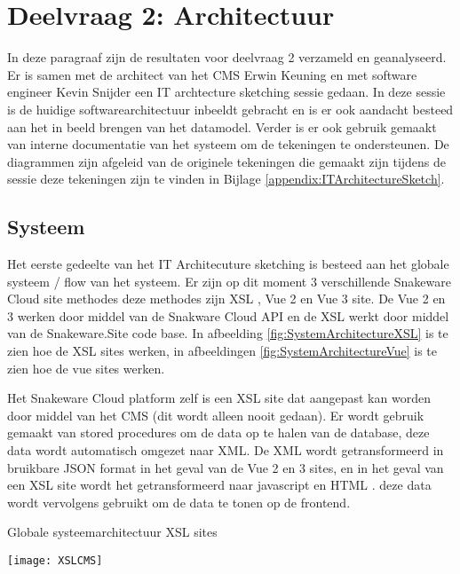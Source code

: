 \section{Deelvraag 2: Architectuur}
In deze paragraaf zijn de resultaten voor deelvraag 2 \textit{\SubquestionTwo} verzameld en geanalyseerd.
Er is samen met de architect van het CMS Erwin Keuning en met software engineer Kevin Snijder een IT archtecture sketching sessie gedaan.
In deze sessie is de huidige softwarearchitectuur inbeeldt gebracht en is er ook aandacht besteed aan het in beeld brengen van het datamodel.
Verder is er ook gebruik gemaakt van interne documentatie van het systeem om de tekeningen te ondersteunen.
De diagrammen zijn afgeleid van de originele tekeningen die gemaakt zijn tijdens de sessie deze tekeningen zijn te vinden in Bijlage \ref{appendix:ITArchitectureSketch}.


\subsection{Systeem}
Het eerste gedeelte van het IT Architecuture sketching is besteed aan het globale systeem / flow van het systeem.
Er zijn op dit moment 3 verschillende Snakeware Cloud site methodes deze methodes zijn \gls{XSL} \Parencite{XSL}, Vue 2 en Vue 3 \Parencite{Vue} site.
De Vue 2 en 3 werken door middel van de Snakware Cloud API en de \gls{XSL} werkt door middel van de Snakeware.Site code base.
In afbeelding \ref{fig:SystemArchitectureXSL} is te zien hoe de \gls{XSL} sites werken, in afbeeldingen \ref{fig:SystemArchitectureVue} is te zien hoe de vue sites werken.

\whitespace
Het Snakeware Cloud platform zelf is een \gls{XSL} site dat aangepast kan worden door middel van het CMS (dit wordt alleen nooit gedaan).
Er wordt gebruik gemaakt van stored procedures om de data op te halen van de database, deze data wordt automatisch omgezet naar XML.
De XML wordt getransformeerd in bruikbare JSON format \Parencite{JSON} in het geval van de Vue 2 en 3 sites, en in het geval van een \gls{XSL} site wordt het getransformeerd naar javascript en HTML \Parencite{HTML}.
deze data wordt vervolgens gebruikt om de data te tonen op de frontend.

\whitespace
\begin{graphic}
	\captionsetup{type=figure}
    \caption{Globale systeemarchitectuur \gls{XSL} sites}
	\texttt{[image: XSLCMS]}
	\label{fig:SystemArchitectureXSL}
\end{graphic}

